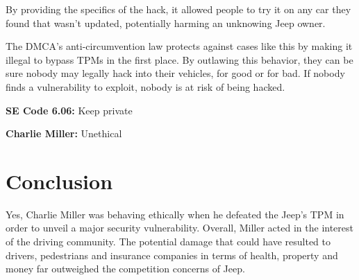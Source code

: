 \documentclass[12pt]{article}
\begin{document}
\begin{multicols}{2}
By providing the specifics of the hack, it allowed people to try it on any car they found  that wasn't updated, potentially harming an unknowing Jeep owner. 

The DMCA's anti-circumvention law protects against cases like this by making it illegal to bypass TPMs in the first place.\cite{DMCA} By outlawing this behavior, they can be sure nobody may legally hack into their vehicles, for good or for bad. If nobody finds a vulnerability to exploit, nobody is at risk of being hacked.\cite{chris}

\begin{framed}
\textbf{SE Code 6.06:} Keep private

\textbf{Charlie Miller:} Unethical
\end{framed}


\section{Conclusion}

Yes, Charlie Miller was behaving ethically when he defeated the Jeep's TPM in order to unveil a major security vulnerability. Overall, Miller acted in the interest of the driving community. The potential damage that could have resulted to drivers, pedestrians and insurance companies in terms of health, property and money far outweighed the competition concerns of Jeep.

\end{multicols}

\nocite{*}



\newpage

\end{document}
